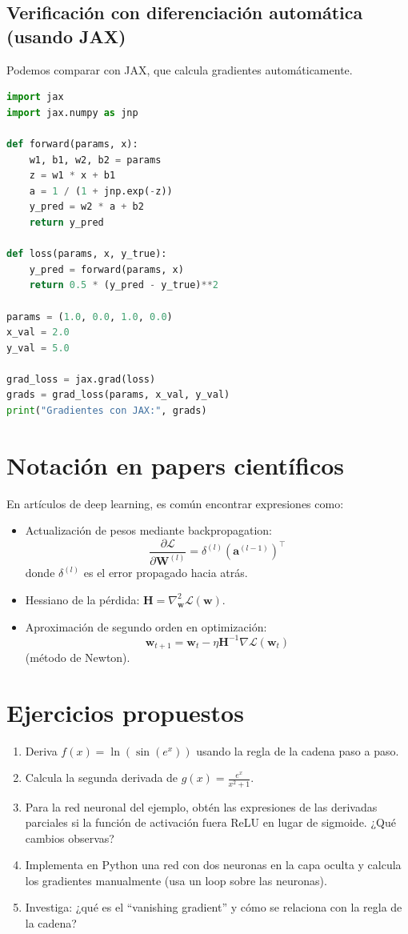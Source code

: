\documentclass[12pt,a4paper,openany,oneside]{book}
\begin{document}
\subsection{Verificación con diferenciación automática (usando JAX)}
Podemos comparar con JAX, que calcula gradientes automáticamente.

\begin{lstlisting}[language=Python]
import jax
import jax.numpy as jnp

def forward(params, x):
    w1, b1, w2, b2 = params
    z = w1 * x + b1
    a = 1 / (1 + jnp.exp(-z))
    y_pred = w2 * a + b2
    return y_pred

def loss(params, x, y_true):
    y_pred = forward(params, x)
    return 0.5 * (y_pred - y_true)**2

params = (1.0, 0.0, 1.0, 0.0)
x_val = 2.0
y_val = 5.0

grad_loss = jax.grad(loss)
grads = grad_loss(params, x_val, y_val)
print("Gradientes con JAX:", grads)
\end{lstlisting}

\section{Notación en papers científicos}
En artículos de deep learning, es común encontrar expresiones como:
\begin{itemize}
    \item Actualización de pesos mediante backpropagation:
    \[
    \frac{\partial \mathcal{L}}{\partial \mathbf{W}^{(l)}} = \delta^{(l)} (\mathbf{a}^{(l-1)})^\top
    \]
    donde $\delta^{(l)}$ es el error propagado hacia atrás.
    \item Hessiano de la pérdida: $\mathbf{H} = \nabla^2_{\mathbf{w}} \mathcal{L}(\mathbf{w})$.
    \item Aproximación de segundo orden en optimización:
    \[
    \mathbf{w}_{t+1} = \mathbf{w}_t - \eta \mathbf{H}^{-1} \nabla \mathcal{L}(\mathbf{w}_t)
    \]
    (método de Newton).
\end{itemize}

\section{Ejercicios propuestos}
\begin{enumerate}
    \item Deriva $f(x) = \ln(\sin(e^x))$ usando la regla de la cadena paso a paso.
    \item Calcula la segunda derivada de $g(x) = \frac{e^x}{x^2 + 1}$.
    \item Para la red neuronal del ejemplo, obtén las expresiones de las derivadas parciales si la función de activación fuera ReLU en lugar de sigmoide. ¿Qué cambios observas?
    \item Implementa en Python una red con dos neuronas en la capa oculta y calcula los gradientes manualmente (usa un loop sobre las neuronas).
    \item Investiga: ¿qué es el ``vanishing gradient'' y cómo se relaciona con la regla de la cadena?
\end{enumerate}
\end{document}
